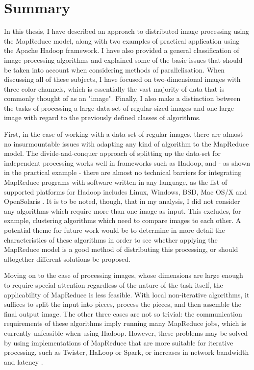 \documentclass [12pt,a4paper]{report}
\begin{document}
\chapter{Summary}

In this thesis, I have described an approach to distributed image processing using the MapReduce model, along with two examples of practical application using the Apache Hadoop framework. I have also provided a general classification of image processing algorithms and explained some of the basic issues that should be taken into account when considering methods of parallelisation. When discussing all of these subjects, I have focused on two-dimensional images with three color channels, which is essentially the vast majority of data that is commonly thought of as an "image". Finally, I also make a distinction between the tasks of processing a large data-set of regular-sized images and one large image with regard to the previously defined classes of algorithms.
 
First, in the case of working with a data-set of regular images, there are almost no insurmountable issues with adapting any kind of algorithm to the MapReduce model. The divide-and-conquer approach of splitting up the data-set for independent processing works well in frameworks such as Hadoop, and - as shown in the practical example - there are almost no technical barriers for integrating MapReduce programs with software written in any language, as the list of supported platforms for Hadoop includes Linux, Windows, BSD, Mac OS/X and OpenSolaris \cite{hadoopfaq}. It is to be noted, though, that in my analysis, I did not consider any algorithms which require more than one image as input. This excludes, for example, clustering algorithms which need to compare images to each other. A potential theme for future work would be to determine in more detail the characteristics of these algorithms in order to see whether applying the MapReduce model is a good method of distributing this processing, or should altogether different solutions be proposed.

Moving on to the case of processing images, whose dimensions are large enough to require special attention regardless of the nature of the task itself, the applicability of MapReduce is less feasible. With local non-iterative algorithms, it suffices to split the input into pieces, process the pieces, and then assemble the final output image. The other three cases are not so trivial: the communication requirements of these algorithms imply running many MapReduce jobs, which is currently unfeasible when using Hadoop. However, these problems may be solved by using implementations of MapReduce that are more suitable for iterative processing, such as Twister, HaLoop or Spark, or increases in network bandwidth and latency \cite{ekanayake2010twister,bu2010haloop,zaharia2010spark}. 
\end{document}
